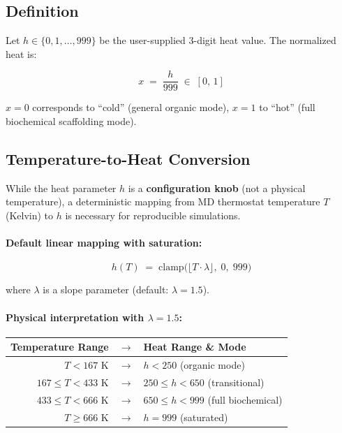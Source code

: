 \documentclass[11pt]{article}
\begin{document}
\subsection{Definition}

Let $h \in \{0,1,\ldots,999\}$ be the user-supplied 3-digit heat value.
The normalized heat is:

\begin{equation}
\label{eq:heat_norm}
x \;=\; \frac{h}{999} \;\in\; [0,\,1]
\end{equation}

$x=0$ corresponds to ``cold'' (general organic mode), $x=1$ to ``hot''
(full biochemical scaffolding mode).

\subsection{Temperature-to-Heat Conversion}

While the heat parameter $h$ is a \textbf{configuration knob} (not a
physical temperature), a deterministic mapping from MD thermostat temperature
$T$ (Kelvin) to $h$ is necessary for reproducible simulations.

\paragraph{Default linear mapping with saturation:}

\begin{equation}
\label{eq:temp_to_heat}
h(T) \;=\; \mathrm{clamp}\!\bigl(\lfloor T \cdot \lambda \rfloor,\; 0,\; 999\bigr)
\end{equation}

where $\lambda$ is a slope parameter (default: $\lambda = 1.5$).

\paragraph{Physical interpretation with $\lambda = 1.5$:}

\begin{center}
\begin{tabular}{rcl}
\toprule
Temperature Range & $\to$ & Heat Range \& Mode \\
\midrule
$T < 167$ K & $\to$ & $h < 250$ (organic mode) \\
$167 \le T < 433$ K & $\to$ & $250 \le h < 650$ (transitional) \\
$433 \le T < 666$ K & $\to$ & $650 \le h < 999$ (full biochemical) \\
$T \ge 666$ K & $\to$ & $h = 999$ (saturated) \\
\bottomrule
\end{tabular}
\end{center}
\end{document}
